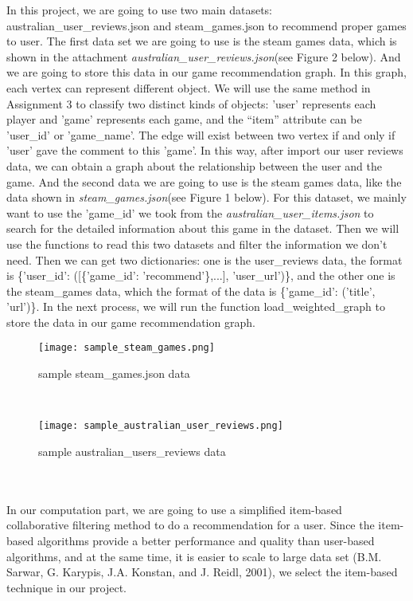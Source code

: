 \documentclass[fontsize=11pt]{article}
\begin{document}
    In this project, we are going to use two main datasets: australian\_user\_reviews.json and steam\_games.json to recommend proper games to user. The first data set we are going to use is the steam games data, which is shown in the attachment \emph{australian\_user\_reviews.json}(see Figure 2 below). And we are going to store this data in our game recommendation graph. In this graph, each vertex can represent different object. We will use the same method in Assignment 3 to classify two distinct kinds of objects: 'user' represents each player and 'game' represents each game, and the “item” attribute can be 'user\_id' or 'game\_name'. The edge will exist between two vertex if and only if 'user' gave the comment to this 'game'. In this way, after import our user reviews data, we can obtain a graph about the relationship between the user and the game. And the second data we are going to use is the steam games data, like the data shown in \emph{steam\_games.json}(see Figure 1 below). For this dataset, we mainly want to use the 'game\_id' we took from the \emph{australian\_user\_items.json} to search for the detailed information about this game in the dataset. Then we will use the functions to read this two datasets and filter the information we don't need. Then we can get two dictionaries: one is the user\_reviews data, the format is \{'user\_id': ([\{'game\_id': 'recommend'\},...], 'user\_url')\}, and the other one is the steam\_games data, which the format of the data is \{'game\_id': ('title', 'url')\}. In the next process, we will run the function load\_weighted\_graph to store the data in our game recommendation graph. 
    \\
    \begin{figure}[H]
        \centering
        \texttt{[image: sample\_steam\_games.png]}
        \caption{sample steam\_games.json data}
        \label{fig:my_label}
    \end{figure}
    \\
    \begin{figure}[H]
        \centering
        \texttt{[image: sample\_australian\_user\_reviews.png]}
        \caption{sample australian\_users\_reviews data}
        \label{fig:my_label}
    \end{figure}
    \\
    \\In our computation part, we are going to use a simplified item-based collaborative filtering method to do a recommendation for a user. Since the item-based algorithms provide a better performance and quality than user-based algorithms, and at the same time, it is easier to scale to large data set (B.M. Sarwar, G. Karypis, J.A. Konstan, and J. Reidl, 2001), we select the item-based technique in our project.
\end{document}

